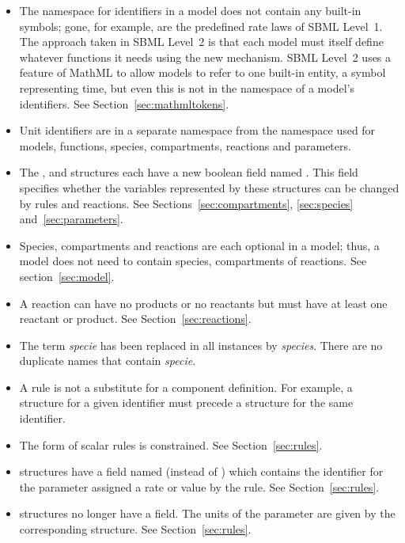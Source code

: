\documentclass[10pt,twocolumntoc]{cekarticle}
\begin{document}
\begin{itemize}
\item The namespace for identifiers in a model does not contain any
  built-in symbols; gone, for example, are the predefined rate laws of SBML
  Level~1.  The approach taken in SBML Level~2 is that each model must
  itself define whatever functions it needs using the new
   mechanism.  SBML Level~2 uses a feature
  of MathML to allow models to refer to one built-in entity, a symbol
  representing time, but even this is not in the namespace of a model's
  identifiers.  See Section~\ref{sec:mathmltokens}.
  
\item Unit identifiers are in a separate namespace from the namespace used
  for models, functions, species, compartments, reactions and parameters.
  
\item The ,  and 
  structures each have a new boolean field named .  This
  field specifies whether the variables represented by these structures
  can be changed by rules and reactions.  See
  Sections~\ref{sec:compartments}, \ref{sec:species}
  and~\ref{sec:parameters}.
  
\item Species, compartments and reactions are each optional in a model;
  thus, a model does not need to contain species, compartments of
  reactions.  See section~\ref{sec:model}.
  
\item A reaction can have no products or no reactants but must have at
  least one reactant or product.  See Section~\ref{sec:reactions}.
  
\item The term \emph{specie} has been replaced in all instances by
  \emph{species}.  There are no duplicate names that contain \emph{specie}.
  
\item A rule is not a substitute for a component definition.  For example,
  a  structure for a given identifier must precede a
   structure for the same identifier.
  
\item The form of scalar rules is constrained.  See
  Section~\ref{sec:rules}.
  
\item {} structures have a field named
   (instead of ) which contains the
  identifier for the parameter assigned a rate or value by the rule.  See
  Section~\ref{sec:rules}.
  
\item {} structures no longer have a 
  field.  The units of the parameter are given by the corresponding
   structure.  See Section~\ref{sec:rules}.

\end{itemize}
\end{document}

